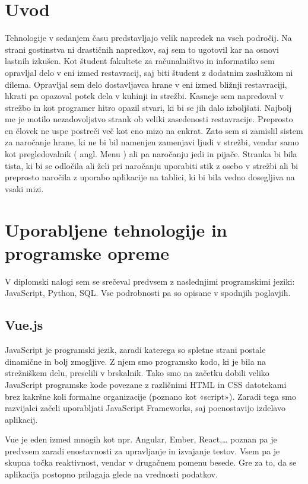 \documentclass[a4paper, 12pt]{book}
\begin{document}
\chapter{Uvod}
Tehnologije v sedanjem času predstavljajo velik napredek na vseh področij. Na strani gostinstva ni drastičnih napredkov, saj sem to ugotovil kar na osnovi lastnih izkušen. Kot študent fakultete za računalništvo in informatiko sem opravljal delo v eni izmed restavracij, saj biti študent z dodatnim zaslužkom ni dilema. Opravljal sem delo dostavljavca hrane v eni izmed bližnji restavraciji, hkrati pa opazoval potek dela v kuhinji in strežbi. Kasneje sem napredoval v strežbo in kot programer hitro opazil stvari, ki bi se jih dalo izboljšati. Najbolj me je motilo nezadovoljstvo strank ob veliki zasedenosti restavracije. Preprosto en človek ne uspe postreči več kot eno mizo na enkrat. Zato sem si zamislil sistem za naročanje hrane, ki ne bi bil namenjen zamenjavi ljudi v strežbi, vendar samo kot pregledovalnik ( angl. Menu ) ali pa naročanju jedi in pijače. Stranka bi bila tista, ki bi se odločila ali želi pri naročanju uporabiti stik z osebo v strežbi ali bi preprosto naročila z uporabo aplikacije na tablici, ki bi bila vedno dosegljiva na vsaki mizi. 


\chapter{Uporabljene tehnologije in programske opreme}
V diplomski nalogi sem se srečeval predvsem z naslednjimi programskimi jeziki: JavaScript, Python, SQL. Vse podrobnosti pa so opisane v spodnjih poglavjih.

\section {Vue.js}
JavaScript je programski jezik, zaradi katerega so spletne strani postale dinamične in bolj zmogljive. Z njem smo programsko kodo, ki je bila na strežniškem delu, preselili v brskalnik. Tako smo na začetku dobili veliko JavaScript programske kode povezane z različnimi HTML in CSS datotekami brez kakršne koli formalne organizacije (poznano kot «script»). Zaradi tega smo razvijalci začeli uporabljati JavaScript Frameworks, saj poenostavijo izdelavo aplikacij.


Vue je eden izmed mnogih kot npr. Angular, Ember, React,… poznan pa je predvsem zaradi enostavnosti za upravljanje in izvajanje testov. Vsem pa je skupna točka reaktivnost, vendar v drugačnem pomenu besede. Gre za to, da se aplikacija postopno prilagaja glede na vrednosti podatkov. 
\end{document}
